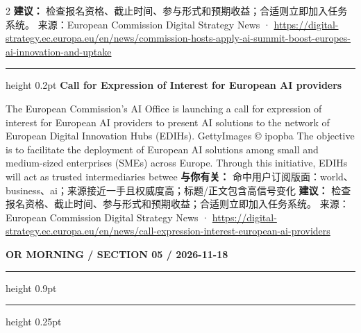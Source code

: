 \documentclass[10.5pt]{ctexart}
\begin{document}
\begin{multicols}{2}
\textbf{建议：} 检查报名资格、截止时间、参与形式和预期收益；合适则立即加入任务系统。
{\footnotesize\color{ormuted} 来源：European Commission Digital Strategy News · \url{https://digital-strategy.ec.europa.eu/en/news/commission-hosts-apply-ai-summit-boost-europes-ai-innovation-and-uptake}}
\vspace{2mm}
\hrule height 0.2pt
\vspace{2mm}
{\large\bfseries Call for Expression of Interest for European AI providers}\par
The European Commission’s AI Office is launching a call for expression of interest for European AI providers to present AI solutions to the network of European Digital Innovation Hubs (EDIHs). GettyImages © ipopba The objective is to facilitate the deployment of European AI solutions among small and medium-sized enterprises (SMEs) across Europe. Through this initiative, EDIHs will act as trusted intermediaries betwee
\textbf{与你有关：} 命中用户订阅版面：world、business、ai；来源接近一手且权威度高；标题/正文包含高信号变化
\textbf{建议：} 检查报名资格、截止时间、参与形式和预期收益；合适则立即加入任务系统。
{\footnotesize\color{ormuted} 来源：European Commission Digital Strategy News · \url{https://digital-strategy.ec.europa.eu/en/news/call-expression-interest-european-ai-providers}}
\end{multicols}
\newpage
{\small\bfseries OR MORNING / SECTION 05 / 2026-11-18}
\vspace{2mm}
\hrule height 0.9pt
\vspace{1.5mm}
\hrule height 0.25pt
\vspace{4mm}
\end{document}
